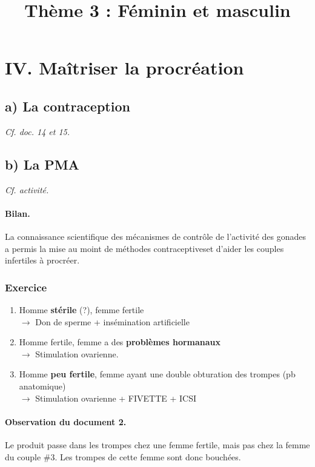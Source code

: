 \documentclass[12pt]{article}
\title{\textbf{Thème 3 : Féminin et masculin}}
\date{}
\renewcommand{\emph}{\textbf}
\begin{document}
\maketitle

\section*{IV. Maîtriser la procréation}

\subsection*{a) La contraception}

\textit{Cf. doc. 14 et 15.}

\subsection*{b) La PMA}

\textit{Cf. activité.}

\paragraph{Bilan.}
La connaissance scientifique des mécanismes de contrôle de l'activité des gonades a permis la mise au moint de méthodes contraceptiveset d'aider les couples infertiles à procréer.

\subsubsection*{Exercice}

\begin{enumerate}
\item Homme \emph{stérile} (?), femme fertile\\
$\rightarrow$ Don de sperme + insémination artificielle
\item Homme fertile, femme a des \emph{problèmes hormanaux}\\
$\rightarrow$ Stimulation ovarienne.
\item Homme \emph{peu fertile}, femme ayant une {double obturation des trompes} (pb anatomique)\\
$\rightarrow$ Stimulation ovarienne + FIVETTE + ICSI
\end{enumerate}

\paragraph{Observation du document 2.}
Le produit passe dans les trompes chez une femme fertile, mais pas chez la femme du couple \#3. Les trompes de cette femme sont donc bouchées.
\end{document}
